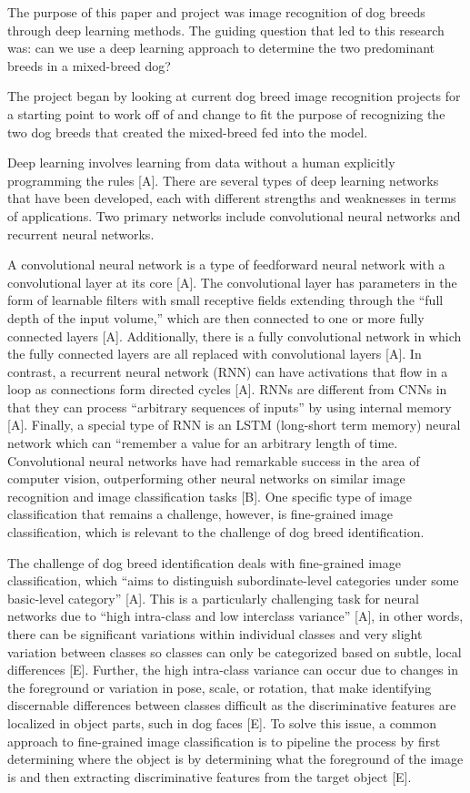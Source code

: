 \documentclass[12pt]{report}
\begin{document}
\indent	\par The purpose of this paper and project was image recognition of dog breeds through deep learning methods. The guiding question that led to this research was: can we use a deep learning approach to determine the two predominant breeds in a mixed-breed dog? 
\par The project began by looking at current dog breed image recognition projects for a starting point to work off of and change to fit the purpose of recognizing the two dog breeds that created the mixed-breed fed into the model.
\par Deep learning involves learning from data without a human explicitly programming the rules [A]. There are several types of deep learning networks that have been developed, each with different strengths and weaknesses in terms of applications. Two primary networks include convolutional neural networks and recurrent neural networks.
\par A convolutional neural network is a type of feedforward neural network with a convolutional layer at its core [A]. The convolutional layer has parameters in the form of learnable filters with small receptive fields extending through the “full depth of the input volume,” which are then connected to one or more fully connected layers [A]. Additionally, there is a fully convolutional network in which the fully connected layers are all replaced with convolutional layers [A]. In contrast, a recurrent neural network (RNN) can have activations that flow in a loop as connections form directed cycles [A]. RNNs are different from CNNs in that they can process “arbitrary sequences of inputs” by using internal memory [A]. Finally, a special type of RNN is an LSTM (long-short term memory) neural network which can “remember a value for an arbitrary length of time. Convolutional neural networks have had remarkable success in the area of computer vision, outperforming other neural networks on similar image recognition and image classification tasks [B]. One specific type of image classification that remains a challenge, however, is fine-grained image classification, which is relevant to the challenge of dog breed identification.
\par The challenge of dog breed identification deals with fine-grained image classification, which “aims to distinguish subordinate-level categories under some basic-level category” [A]. This is a particularly challenging task for neural networks due to “high intra-class and low interclass variance” [A], in other words, there can be significant variations within individual classes and very slight variation between classes so classes can only be categorized based on subtle, local differences [E]. Further, the high intra-class variance can occur due to changes in the foreground or variation in pose, scale, or rotation, that make identifying discernable differences between classes difficult as the discriminative features are localized in object parts, such in dog faces [E]. To solve this issue, a common approach to fine-grained image classification is to pipeline the process by first determining where the object is by determining what the foreground of the image is and then extracting discriminative features from the target object [E].
\end{document}
